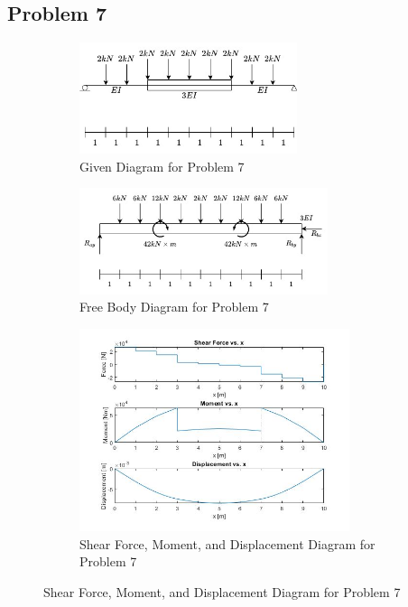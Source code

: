 \documentclass[a4paper]{article}
\begin{document}
\subsection{Problem 7}
\begin{figure}[H]
\centering
   \begin{subfigure}[b]{\textwidth}
   \centering
   \includegraphics[width=0.7\textwidth]{problems/prob_7.jpg}
   \caption{Given Diagram for Problem 7}
   \label{prob7:prob} 
\end{subfigure}
\begin{subfigure}[b]{\textwidth}
   \centering   
   \includegraphics[width=0.8\textwidth]{FBD/FBD_7_new.jpg}
   \caption{Free Body Diagram for Problem 7}
   \label{prob7:FBD}
\end{subfigure}
\begin{subfigure}[b]{\textwidth}
   \centering   
   \includegraphics[width=0.87\textwidth]{results/solution_7.jpg}
   \caption{Shear Force, Moment, and Displacement Diagram for Problem 7}
   \label{prob7:results}
\end{subfigure}
\label{prob7}
\end{figure}
\end{document}
